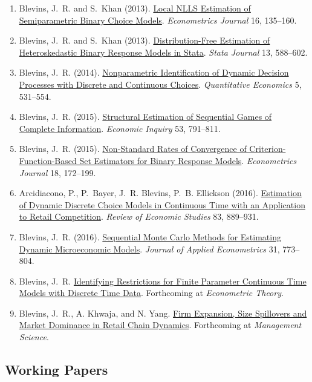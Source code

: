 \documentclass[10pt,letterpaper]{article}
\begin{document}
\begin{enumerate}
\item Blevins, J.~R. and S.~Khan (2013).
  \href{http://jblevins.org/research/lnlls}{Local NLLS Estimation of Semiparametric Binary Choice Models}.
  \textit{Econometrics Journal} 16, 135--160.
\item Blevins, J.~R. and S.~Khan (2013).
  \href{http://jblevins.org/research/dfbr/}{Distribution-Free Estimation of Heteroskedastic Binary Response Models in Stata}.
  \textit{Stata Journal} 13, 588--602.
\item Blevins, J.~R. (2014).
  \href{http://jblevins.org/research/dcident}{Nonparametric Identification of Dynamic Decision Processes with Discrete and Continuous Choices}.
  \textit{Quantitative Economics} 5, 531--554.
\item Blevins, J.~R. (2015).
  \href{http://jblevins.org/research/seqgame}{Structural Estimation of Sequential Games of Complete Information}.
  \textit{Economic Inquiry} 53, 791--811.
\item Blevins, J.~R. (2015).
  \href{http://jblevins.org/research/cuberoot}{Non-Standard Rates of Convergence of Criterion-Function-Based Set Estimators for Binary Response Models}.
  \textit{Econometrics Journal} 18, 172--199.
\item Arcidiacono, P., P.~Bayer, J.~R. Blevins, P.~B. Ellickson (2016).
  \href{http://jblevins.org/research/abbe}{Estimation of Dynamic Discrete Choice Models in Continuous Time with an Application to Retail Competition}.
  \textit{Review of Economic Studies} 83, 889--931.
\item Blevins, J.~R. (2016).
  \href{http://jblevins.org/research/smcdmm}{Sequential Monte Carlo Methods for Estimating Dynamic Microeconomic Models}.
  \textit{Journal of Applied Econometrics} 31, 773--804.
\item Blevins, J.~R.
  \href{http://jblevins.org/research/sde}{Identifying Restrictions for Finite Parameter Continuous Time Models with Discrete Time Data}.
  Forthcoming at \textit{Econometric Theory}.
\item Blevins, J.~R., A. Khwaja, and N. Yang.
  \href{http://jblevins.org/research/bky}{Firm Expansion, Size Spillovers and Market Dominance in Retail Chain Dynamics}.
  Forthcoming at \textit{Management Science}.
\end{enumerate}

\subsection*{Working Papers}
\end{document}

